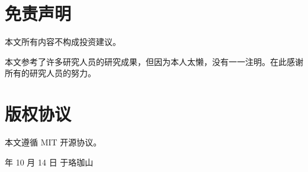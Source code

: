 \documentclass[12pt, a4paper, oneside]{ctexart}
\begin{document}
\section*{免责声明}

本文所有内容不构成投资建议。

本文参考了许多研究人员的研究成果，但因为本人太懒，没有一一注明。在此感谢所有的研究人员的努力。

\section*{版权协议}

本文遵循 MIT 开源协议。

 年 10 月 14 日 于珞珈山
\end{document}

